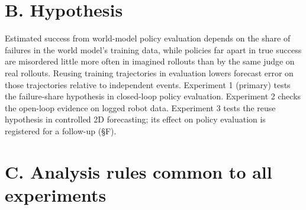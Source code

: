 \documentclass[10pt,letterpaper]{article}
\begin{document}
\hypertarget{b.-hypothesis}{%
\section{B. Hypothesis}\label{b.-hypothesis}}

Estimated success from world-model policy evaluation depends
on the share of failures in the world model's training data,
while policies far apart in true success are misordered
little more often in imagined rollouts than by the same
judge on real rollouts. Reusing training trajectories in
evaluation lowers forecast error on those trajectories
relative to independent events. Experiment 1 (primary) tests
the failure-share hypothesis in closed-loop policy
evaluation. Experiment 2 checks the open-loop evidence on
logged robot data. Experiment 3 tests the reuse hypothesis
in controlled 2D forecasting; its effect on policy
evaluation is registered for a follow-up (§F).

\hypertarget{c.-analysis-rules-common-to-all-experiments}{%
\section{C. Analysis rules common to all
experiments}\label{c.-analysis-rules-common-to-all-experiments}}
\end{document}
